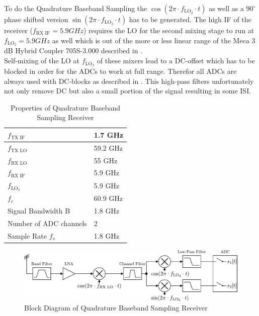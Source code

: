 To do the Quadrature Baseband Sampling the
$\cos(2\pi \cdot f_{\text{LO}_2} \cdot t)$ as well as a $90^\circ$
phase shifted version $\sin(2\pi \cdot f_{\text{LO}_2} \cdot t)$ has to be
generated.
The high \gls{IF} of the receiver ($f_{\text{RX IF}} = 5.9 GHz$) requires
the \gls{LO} for the second mixing stage to run at $f_{\text{LO}_2} = 5.9 GHz$
as well which is out of the more or less linear range of the
Meca 3 dB Hybrid Coupler 705S-3.000 described in . \\

Self-mixing of the \gls{LO} at $f_{\text{LO}_2}$ of these mixers lead
to a \gls{DC}-offset which has to be blocked in order for the
\glspl{ADC} to work at full range.
Therefor all \glspl{ADC} are always used with \gls{DC}-blocks as described
in . This high-pass filters unfortunately
not only remove \gls{DC} but also a small portion of the signal
resulting in some \gls{ISI}. \\

\begin{table}[h]
  \centering
  \begin{tabular}{|l|l|}
    \hline
    $f_{\text{TX IF}}$              & 1.7 GHz \\ \hline
    $f_{\text{TX LO}}$              & 59.2 GHz \\ \hline
    $f_{\text{RX LO}}$              & 55 GHz \\ \hline
    $f_{\text{RX IF}}$              & 5.9 GHz \\ \hline
    $f_{\text{LO}_2}$               & 5.9 GHz \\ \hline
    $f_c$                         & 60.9 GHz \\ \hline
    Signal Bandwidth B           & 1.8 GHz \\ \hline
    Number of \gls{ADC} channels & 2 \\ \hline
    Sample Rate $f_s$ & 1.8 GHz \\ \hline
  \end{tabular}
  \caption{Properties of Quadrature Baseband Sampling Receiver}
  \label{tab:rx_0}
\end{table}

\begin{figure}[h!]
  \centering
  \includegraphics[width=\textwidth]{figures/rx_0_bd}
  \caption{Block Diagram of Quadrature Baseband Sampling Receiver}
  \label{fig:rx_0_bd}
\end{figure}

